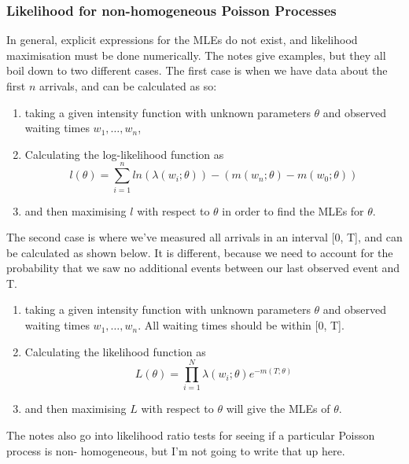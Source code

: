 \subsubsection{Likelihood for non-homogeneous Poisson Processes}
In general, explicit expressions for the MLEs do not exist, and likelihood maximisation must be 
done numerically.
The notes give examples, but they all boil down to two different cases. The first case is when we have data about the first \(n\) arrivals, and can be calculated as so:
\begin{enumerate}
    \item taking a given intensity function with unknown parameters \(\theta\) and observed waiting times \(w_1, \dots, w_n\),
    \item Calculating the log-likelihood function as 
        \begin{equation*}
            l(\theta) = \sum_{i=1}^{n}ln\left(\lambda(w_i; \theta)\right) - 
            \left(m(w_n; \theta) - m(w_0; \theta)\right)
        \end{equation*}
    \item and then maximising \(l\) with respect to \(\theta\) in order to find the MLEs for \(\theta\).
\end{enumerate}

The second case is where we've measured all arrivals in an interval [0, T], and can be 
calculated as shown below. It is different, because we need to account for the probability that 
we saw no additional events between our last observed event and T.
\begin{enumerate}
    \item taking a given intensity function with unknown parameters \(\theta\) and observed waiting times \(w_1, \dots, w_n\). All waiting times should be within [0, T].
    \item Calculating the likelihood function as 
        \begin{equation*}
            L(\theta) = \prod_{i=1}^{N}\lambda(w_i; \theta) e^{-m(T; \theta)}
        \end{equation*}
    \item and then maximising \(L\) with respect to \(\theta\) will give the MLEs of \(\theta\).
\end{enumerate}

The notes also go into likelihood ratio tests for seeing if a particular
Poisson process is non- homogeneous, but I'm not going to write that up
here.
